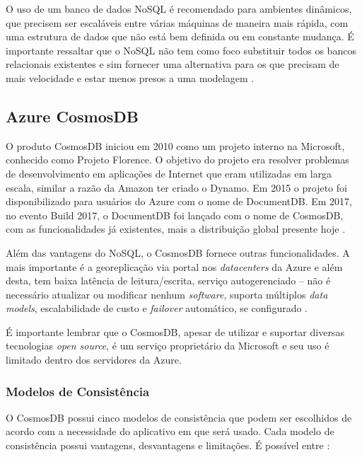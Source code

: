 \documentclass[12pt]{article}
\begin{document}
O uso de um banco de dados NoSQL é recomendado para ambientes dinâmicos, que precisem ser escaláveis entre várias máquinas de maneira mais rápida, com uma estrutura de dados que não está bem 
definida ou em constante mudança. É importante ressaltar que o NoSQL não tem como foco substituir todos os bancos relacionais existentes e sim fornecer uma alternativa para os que 
precisam de mais velocidade e estar menos presos a uma modelagem \cite{Oliveira2011} \cite{Lith2010} \cite{Leavitt2010}. 

\subsection{Azure CosmosDB}
O produto CosmosDB iniciou em 2010 como um projeto interno na Microsoft, conhecido como Projeto Florence. O objetivo do projeto era resolver problemas de desenvolvimento em aplicações de Internet
que eram utilizadas em larga escala, similar a razão da Amazon ter criado o Dynamo. Em 2015 o projeto foi disponibilizado para usuários do Azure com o nome de DocumentDB. Em 2017, no evento Build 2017,
o DocumentDB foi lançado com o nome de CosmosDB, com as funcionalidades já existentes, mais a distribuição global presente hoje \cite{Paz2018}.

Além das vantagens do NoSQL, o CosmosDB fornece outras funcionalidades. A mais importante é a georeplicação via portal nos \textit{datacenters} da Azure e além desta, tem baixa latência de leitura/escrita,
serviço autogerenciado -- não é necessário atualizar ou modificar nenhum \textit{software}, suporta múltiplos \textit{data models}, escalabilidade de custo e \textit{failover} automático, se configurado \cite{Paz2018} \cite{Shukla2015}.

É importante lembrar que o CosmosDB, apesar de utilizar e suportar diversas tecnologias \textit{open source}, é um serviço proprietário da Microsoft e seu uso é limitado dentro dos 
servidores da Azure.

\subsubsection{Modelos de Consistência}
O CosmosDB possui cinco modelos de consistência que podem ser escolhidos de acordo com a necessidade do aplicativo em que será usado. Cada modelo de consistência possui vantagens, desvantagens e limitações.
É possível entre \cite{Paz2018} \cite{Shukla2015}:
\end{document}
